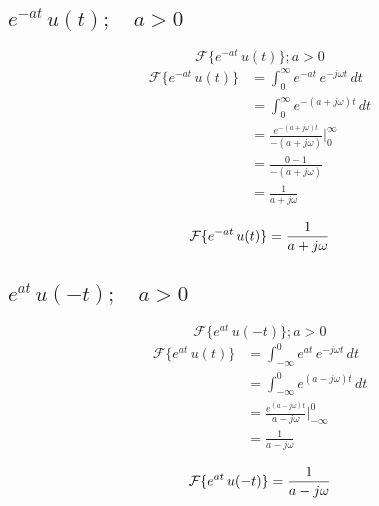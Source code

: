 \subsection{$e^{-at}\,u(t);\quad a>0$}
\begin{equation*}
    \mathcal{F}\{e^{-at}\,u(t)\}; a>0
\end{equation*}
\begin{equation*}
\begin{split}
    \mathcal{F}\{e^{-at}\,u(t)\}
        &=\int_0^\infty e^{-at}\,e^{-j\omega t}\,dt\\
        &=\int_0^\infty e^{-(a+j\omega)t}\,dt\\
        &=\frac{e^{-(a+j\omega)t}}{-(a+j\omega)}\Biggr|_0^\infty\\
        &=\frac{0-1}{-(a+j\omega)}\\
        &=\frac{1}{a+j\omega}\\
\end{split}
\end{equation*}
\begin{equation}
    \mathcal{F}\{e^{-at}\,u(t)\}=\frac{1}{a+j\omega}\\
\end{equation}

\subsection{$e^{at}\,u(-t);\quad a>0$}
\begin{equation*}
    \mathcal{F}\{e^{at}\,u(-t)\}; a>0
\end{equation*}
\begin{equation*}
\begin{split}
    \mathcal{F}\{e^{at}\,u(t)\}
        &=\int_{-\infty}^0 e^{at}\,e^{-j\omega t}\,dt\\
        &=\int_{-\infty}^0 e^{(a-j\omega)t}\,dt\\
        &=\frac{e^{(a-j\omega)t}}{a-j\omega}\Biggr|_{-\infty}^0\\
        &=\frac{1}{a-j\omega}\\
\end{split}
\end{equation*}
\begin{equation}
    \mathcal{F}\{e^{at}\,u(-t)\}=\frac{1}{a-j\omega}\\
\end{equation}

